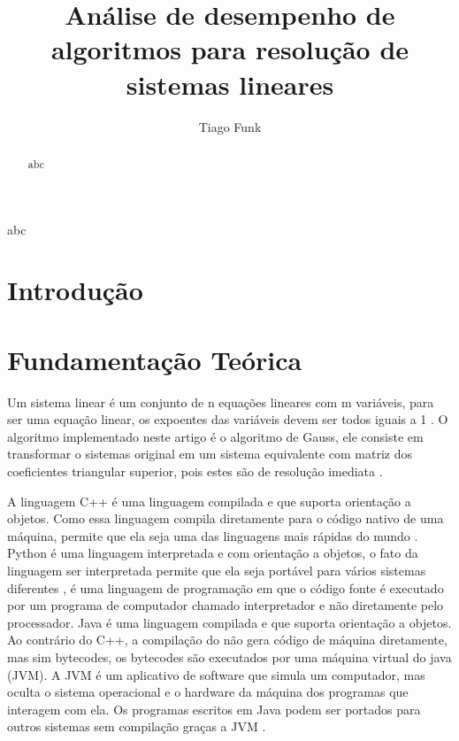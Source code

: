 \documentclass[12pt]{article}
\title{Análise de desempenho de algoritmos para resolução de sistemas lineares}
\author{Tiago Funk\inst{1}}
\date{}
\begin{document}
 

\maketitle

\begin{abstract}
  abc
\end{abstract}

\begin{resumo} 
  abc
\end{resumo}


\section{Introdução}

\section{Fundamentação Teórica}

Um sistema linear é um conjunto de n equações lineares com m variáveis, para ser uma equação linear, os expoentes das variáveis devem ser todos iguais a 1 \cite{matematicaEnsinoMedio}. O algoritmo implementado neste artigo é o algoritmo de Gauss, ele consiste em transformar o sistemas original em um sistema equivalente com matriz dos coeficientes triangular superior, pois estes são de resolução imediata \cite{calculoNumerico}.

A linguagem C++ é uma linguagem compilada e que suporta orientação a objetos. Como essa linguagem compila diretamente para o código nativo de uma máquina, permite que ela seja uma das linguagens mais rápidas do mundo \cite{descricaoCPP}. Python é uma linguagem interpretada e com orientação a objetos, o fato da linguagem ser interpretada permite que ela seja portável para vários sistemas diferentes \cite{descricaoPython},  é uma linguagem de programação em que o código fonte é executado por um programa de computador chamado interpretador e não diretamente pelo processador. Java é uma linguagem compilada e que suporta orientação a objetos. Ao contrário do C++, a compilação do não gera código de máquina diretamente, mas sim bytecodes, os bytecodes são executados por uma máquina virtual do java (JVM). A JVM é um aplicativo de software que simula um computador, mas oculta o sistema operacional e o hardware da máquina dos programas que interagem com ela. Os programas escritos em Java podem ser portados para outros sistemas sem compilação graças a JVM \cite{javaComoProgramar}.
\end{document}
